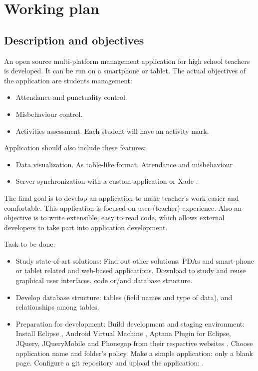 \chapter{Working plan}
\section{Description and objectives}

	An open source multi-platform management application for high school teachers is developed. It can be run on a smartphone or tablet. 
	The actual objectives of the application are students management:
	\begin{itemize}
	  \item Attendance and punctuality control. 
	  \item Misbehaviour control.
	  \item Activities assessment. Each student will have an activity mark.
	\end{itemize}

	Application should also include these features:
	\begin{itemize}
	  \item Data visualization. As table-like format. Attendance and misbehaviour
	  \item Server synchronization with a custom application or Xade \cite{Xade}.
	\end{itemize}

	The final goal is to develop an application to make teacher's work easier and comfortable. This application is focused on user  (teacher) experience.
	Also an objective is to write extensible, easy to read code, which allows external developers to take part into application development.
	
	Task to be done:
	\begin{itemize}
	  \item Study state-of-art solutions: 
  \subitem  Find out other solutions: PDAs and smart-phone or tablet related and web-based applications.
  \subitem  Download to study and reuse graphical user interfaces, code or/and database structure. 
  \item   Develop database structure: tables (field names and type of data), and relationships among tables. 
  \item   Preparation for development:
\subitem  Build development and staging environment: 
\subsubitem Install Eclipse \cite{Eclipse}, Android Virtual Machine \cite{AndroidDevelopmentKit}, Aptana Plugin for Eclipse, JQuery, JQueryMobile \cite{JQueryMobile} and Phonegap \cite{PhoneGap} from their respective websites \cite{PhoneGapGS}.
\subitem   Choose application name and folder's policy.
\subitem   Make a simple application: only a blank page.
\subitem  Configure a git repository and upload the application: \cite{EduXes}.
	\end{itemize}
	
